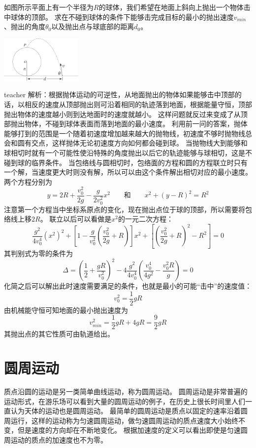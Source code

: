 \begin{example}
如图所示平面上有一个半径为$R$的球体，我们希望在地面上斜向上抛出一个物体击中球体的顶部。
求在不碰到球体的条件下能够击完成目标的最小的抛出速度$v_{min}$、抛出的角度$\theta_0$以及抛出点与球底部的距离$d_0$。
\begin{flushright}
\includegraphics[width = 0.3\textwidth]{images/motion-13.pdf} 
\end{flushright}
\begin{taggedblock}{teacher}
\noindent
解析：根据抛体运动的可逆性，从地面抛出的物体如果能够击中顶部的话，以相反的速度从顶部抛出则可沿着相同的轨迹落到地面，根据能量守恒，顶部抛出物体的速度越小则到达地面时的速度就越小。
这样问题就反过来变成了从顶部抛出物体，不碰到球体表面而落到地面的最小速度。
利用前一问的答案，抛体能够打到的范围是一个随着初速度增加越来越大的抛物线，初速度不够时抛物线总会和圆有交点，这样抛体无论初速度方向如何都会碰到球。
当抛物线大到能够和球相切时就有一个可能性使沿特殊的角度抛出以后它的轨迹能够与球相切，这是不碰到球的临界条件。
当包络线与圆相切时，包络面的方程和圆的方程联立时只有一个解，当速度更大时则没有解，所以可以由这个条件解出相切对应的最小速度。
两个方程分别为
\[
y=2R+\frac{v_0^2}{2g}-\frac{g}{2v_0^2}x^2 \qquad 和\qquad
x^2+(y-R)^2=R^2
\]
注意第一个方程当中坐标系原点的变化，现在抛出点位于球的顶部，所以需要将包络线上移$2R$。
联立以后可以看做是$x^2$的一元二次方程：
\[
\frac{g^2}{4v_0^4}(x^2)^2 +\left [ 1-\frac{g}{v_0^2}(\frac{v_0^2}{2g}+R) \right ]x^2+\left [  (\frac{v_0^2}{2g}+R)^2-R^2 \right ]=0
\]
其判别式为零的条件为
\[
\Delta =(\frac{1}{2}+\frac{gR}{v_0^2})^2-4\frac{g^2}{4v_0^4}(\frac{v_0^4}{4g^2}-\frac{v_0^2R}{g})=0
\]
化简之后可以解出此时速度需要满足的条件，也就是最小的可能“击中”的速度值：
\[
v_0^2 = \frac{1}{2}gR
\]
由机械能守恒可知地面的最小抛出速度为
\[
v_{min}^2=\frac{1}{2}gR+4gR = \frac{9}{2}gR
\]
其抛出点的其它性质可由轨道给出。
\end{taggedblock}
\end{example}

\section{圆周运动}
质点沿圆的运动是另一类简单曲线运动，称为{\heiti 圆周运动}。
圆周运动是非常普遍的运动形式，在游乐场可以看到大量的圆周运动的例子，在历史上很长时间里人们一直认为天体的运动也是圆周运动。
最简单的圆周运动是质点以固定的速率沿着圆周运行，这样的运动称为{\heiti 匀速圆周运动}，做匀速圆周运动的质点速度大小始终不变，但是速度的方向却在不断地变化。
根据加速度的定义可以看出即使是匀速圆周运动的质点的加速度也不为零。

